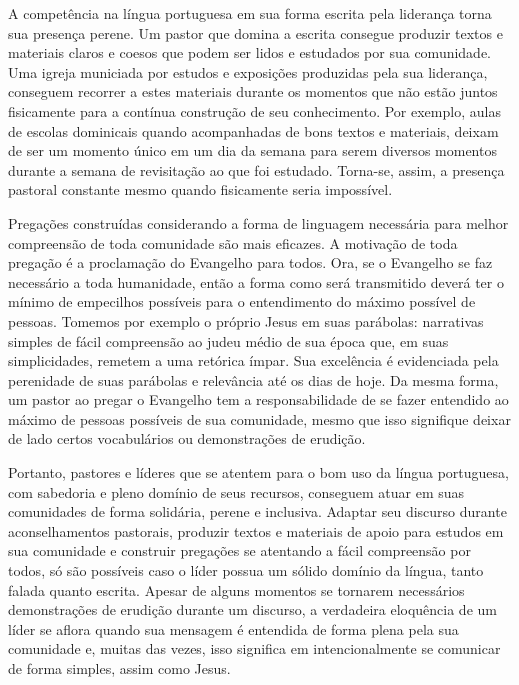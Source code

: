 \documentclass[
    article,            %
	12pt,				%
	oneside,			%
	a4paper,			%
	chapter=TITLE,		%
	section=TITLE,		%
	english,			%
	french,				%
	spanish,			%
	brazil				%
	]{abntex2}
\begin{document}
A competência na língua portuguesa em sua forma escrita pela liderança torna sua presença perene. Um pastor que domina a escrita consegue produzir textos e materiais claros e coesos que podem ser lidos e estudados por sua comunidade. Uma igreja municiada por estudos e exposições produzidas pela sua liderança, conseguem recorrer a estes materiais durante os momentos que não estão juntos fisicamente para a contínua construção de seu conhecimento. Por exemplo, aulas de escolas dominicais quando acompanhadas de bons textos e materiais, deixam de ser um momento único em um dia da semana para serem diversos momentos durante a semana de revisitação ao que foi estudado. Torna-se, assim, a presença pastoral constante mesmo quando fisicamente seria impossível.

Pregações construídas considerando a forma de linguagem necessária para melhor compreensão de toda comunidade são mais eficazes. A motivação de toda pregação é a proclamação do Evangelho para todos. Ora, se o Evangelho se faz necessário a toda humanidade, então a forma como será transmitido deverá ter o mínimo de empecilhos possíveis para o entendimento do máximo possível de pessoas. Tomemos por exemplo o próprio Jesus em suas parábolas: narrativas simples de fácil compreensão ao judeu médio de sua época que, em suas simplicidades, remetem a uma retórica ímpar. Sua excelência é evidenciada pela perenidade de suas parábolas e relevância até os dias de hoje. Da mesma forma, um pastor ao pregar o Evangelho tem a responsabilidade de se fazer entendido ao máximo de pessoas possíveis de sua comunidade, mesmo que isso signifique deixar de lado certos vocabulários ou demonstrações de erudição.

Portanto, pastores e líderes que se atentem para o bom uso da língua portuguesa, com sabedoria e pleno domínio de seus recursos, conseguem atuar em suas comunidades de forma solidária, perene e inclusiva. Adaptar seu discurso durante aconselhamentos pastorais, produzir textos e materiais de apoio para estudos em sua comunidade e construir pregações se atentando a fácil compreensão por todos, só são possíveis caso o líder possua um sólido domínio da língua, tanto falada quanto escrita. Apesar de alguns momentos se tornarem necessários demonstrações de erudição durante um discurso, a verdadeira eloquência de um líder se aflora quando sua mensagem é entendida de forma plena pela sua comunidade e, muitas das vezes, isso significa em intencionalmente se comunicar de forma simples, assim como Jesus.
% 
\end{document}

